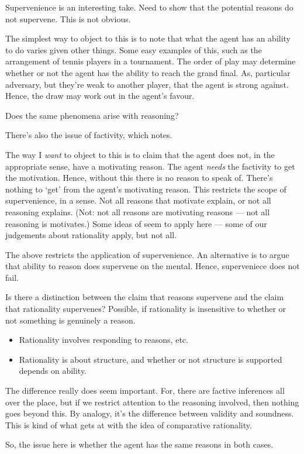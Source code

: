 \documentclass[10pt]{article}
\begin{document}
\begin{note}
  Supervenience is an interesting take.
  Need to show that the potential reasons do not supervene.
  This is not obvious.

  The simplest way to object to this is to note that what the agent has an ability to do varies given other things.
  Some easy examples of this, such as the arrangement of tennis players in a tournament.
  The order of play may determine whether or not the agent has the ability to reach the grand final.
  As, particular adversary, but they're weak to another player, that the agent is strong against.
  Hence, the draw may work out in the agent's favour.

  Does the same phenomena arise with reasoning?

  There's also the issue of factivity, which \citeauthor{Singh:2019aa} notes.

  The way I \emph{want} to object to this is to claim that the agent does not, in the appropriate sense, have a motivating reason.
  The agent \emph{needs} the factivity to get the motivation.
  Hence, without this there is no reason to speak of.
  There's nothing to `get' from the agent's motivating reason.
  This restricts the scope of supervenience, in a sense.
  Not all reasons that motivate explain, or not all reasoning explains.
  (Not: not all reasons are motivating reasons --- not all reasoning is motivates.)
  Some ideas of \citeauthor{Lord:2018aa} seem to apply here --- some of our judgements about rationality apply, but not all.

  The above restricts the application of supervenience.
  An alternative is to argue that ability to reason does supervene on the mental.
  Hence, superveniece does not fail.
\end{note}

\begin{note}
  Is there a distinction between the claim that reasons supervene and the claim that rationality supervenes?
  Possible, if rationality is insensitive to whether or not something is genuinely a reason.

  \begin{itemize}
  \item Rationality involves responding to reasons, etc.\
  \item Rationality is about structure, and whether or not structure is supported depends on ability.
  \end{itemize}

  The difference really does seem important.
  For, there are factive inferences all over the place, but if we restrict attention to the reasoning involved, then nothing goes beyond this.
  By analogy, it's the difference between validity and soundness.
  This is kind of what \citeauthor{Lord:2018aa} gets at with the idea of comparative rationality.

  So, the issue here is whether the agent has the same reasons in both cases.
\end{note}
\end{document}
